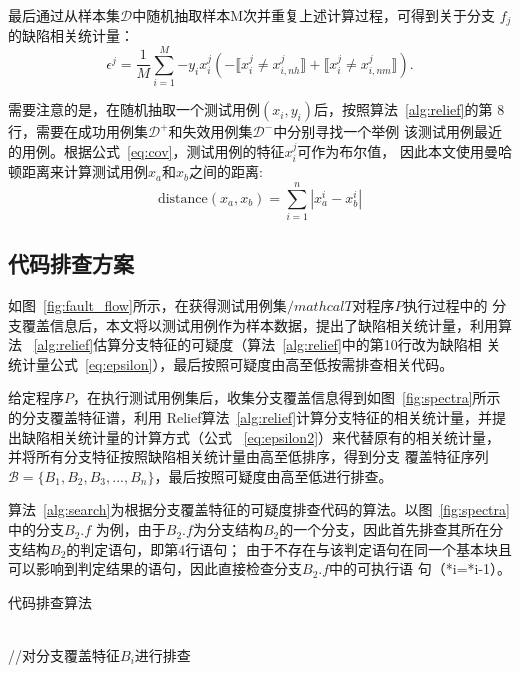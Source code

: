 最后通过从样本集$\mathcal D$中随机抽取样本M次并重复上述计算过程，可得到关于分支
$f_j$的缺陷相关统计量：
\begin{equation}
       \epsilon^j = \frac{1}{M}\sum_{i=1}^M{ -y_ix_i^j(-\llbracket x_i^j \neq x_{i,nh}^j \rrbracket + \llbracket x_i^j \neq x_{i,nm}^j \rrbracket)}. \label{eq:epsilon2}
\end{equation}

需要注意的是，在随机抽取一个测试用例$(x_i,y_i)$后，按照算法~\ref{alg:relief}的第
8行，需要在成功用例集$\mathcal D^+$和失效用例集$\mathcal D^-$中分别寻找一个举例
该测试用例最近的用例。根据公式~\ref{eq:cov}，测试用例的特征$x_i^j$可作为布尔值，
因此本文使用曼哈顿距离来计算测试用例$x_a$和$x_b$之间的距离:
\begin{equation}
      \text{distance}(x_a,x_b) = \sum_{i=1}^n{|x_a^i-x_b^i|}
\end{equation}

\subsection{代码排查方案}
如图~\ref{fig:fault_flow}所示，在获得测试用例集$/mathcal T$对程序$P$执行过程中的
分支覆盖信息后，本文将以测试用例作为样本数据，提出了缺陷相关统计量，利用算法
~\ref{alg:relief}估算分支特征的可疑度（算法~\ref{alg:relief}中的第10行改为缺陷相
关统计量公式~\ref{eq:epsilon}），最后按照可疑度由高至低按需排查相关代码。

给定程序$P$，在执行测试用例集后，收集分支覆盖信息得到如图~\ref{fig:spectra}所示的分支覆盖特征谱，利用
Relief算法~\ref{alg:relief}计算分支特征的相关统计量，并提出缺陷相关统计量的计算方式（公式
~\ref{eq:epsilon2}）来代替原有的相关统计量，并将所有分支特征按照缺陷相关统计量由高至低排序，得到分支
覆盖特征序列$\mathcal B=\{B_1,B_2,B_3,...,B_n\}$，最后按照可疑度由高至低进行排查。

算法~\ref{alg:search}为根据分支覆盖特征的可疑度排查代码的算法。以图~\ref{fig:spectra}中的分支$B_2.f$
为例，由于$B_2.f$为分支结构$B_2$的一个分支，因此首先排查其所在分支结构$B_2$的判定语句，即第4行语句；
由于不存在与该判定语句在同一个基本块且可以影响到判定结果的语句，因此直接检查分支$B_2.f$中的可执行语
句（*i=*i-1）。

\begin{algorithm}[H]
\caption{代码排查算法}\label{alg:search}
\\
 {
      //对分支覆盖特征$B_i$进行排查 \\
}
\end{algorithm}

